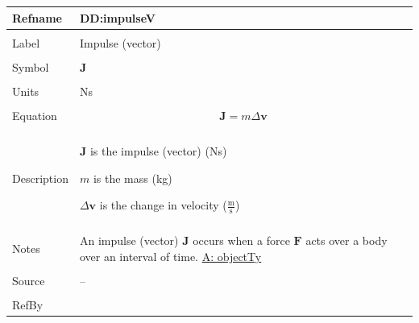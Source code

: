 \documentclass[12pt]{article}
\begin{document}
\noindent \begin{minipage}{\textwidth}
          \begin{tabular}{>{\raggedright}p{}>{\raggedright\arraybackslash}p{}}
          \toprule \textbf{Refname} & \textbf{DD:impulseV}
          \label{DD:impulseV}
          \\ \midrule \\
          Label & Impulse (vector)
          \\ \midrule \\
          Symbol & $\mathbf{J}$
          \\ \midrule \\
          Units & Ns
          \\ \midrule \\
          Equation & \begin{displaymath}
                     \mathbf{J}=m Δ\mathbf{v}
                     \end{displaymath}
          \\ \midrule \\
          Description & \begin{symbDescription}
                        \item{$\mathbf{J}$ is the impulse (vector) (Ns)}
                        \item{$m$ is the mass (kg)}
                        \item{$Δ\mathbf{v}$ is the change in velocity ($\frac{\text{m}}{\text{s}}$)}
                        \end{symbDescription}
          \\ \midrule \\
          Notes & An impulse (vector) $\mathbf{J}$ occurs when a force $\mathbf{F}$ acts over a body over an interval of time.
                  \hyperref[assumpOT]{A: objectTy}
          \\ \midrule \\
          Source & --
          \\ \midrule \\
          RefBy & 
          \\ \bottomrule
          \end{tabular}
          \end{minipage}
\end{document}
